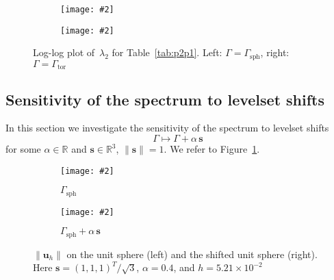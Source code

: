 \documentclass[12pt]{article}
\newcommand{\includegraphicsw}[2][1.]{\texttt{[image: \#2]}}
\newcommand{\vect}[1]{\boldsymbol{\mathbf{#1}}}
\newcommand{\sphere}{{\Gamma_{\text{sph}}}}
\newcommand{\tor}{{\Gamma_{\text{tor}}}}
\begin{document}
\addtocounter{table}{-1}
\begin{figure}[H]
	\centering\small
	\begin{subfigure}{.49\linewidth}
		\centering
		\includegraphicsw{sphere_2_P2P1_consistent.png}
	\end{subfigure}%
	\hfill
	\begin{subfigure}{.49\linewidth}
		\centering
		\includegraphicsw{torus_P2P1_consistent.png}
	\end{subfigure}
	\caption{Log-log plot of~$\lambda_2$ for Table~\ref{tab:p2p1}. Left: $\Gamma = \sphere$, right: $\Gamma = \tor$}
\end{figure}

\subsection{Sensitivity of the spectrum to levelset shifts}

In this section we investigate the sensitivity of the spectrum to levelset shifts
\begin{equation}\label{shift}
\Gamma \mapsto \Gamma + \alpha\,\vect s
\end{equation}
for some $\alpha \in \mathbb R$ and $\vect s \in \mathbb R^3$, $\|\vect s\| = 1$. We refer to Figure~\ref{fig:shift}.

\begin{figure}[H]
	\centering
	\begin{subfigure}{.2\linewidth}\end{subfigure}%
	\begin{subfigure}{.3\linewidth}
		\centering
		\includegraphicsw[.9]{{shift_0.0.cropped}.png}
		\caption{$\sphere$}
	\end{subfigure}%
	\begin{subfigure}{.3\linewidth}
		\centering
		\includegraphicsw[.9]{{shift_0.4.cropped}.png}
		\caption{$\sphere + \alpha\,\vect s$}
	\end{subfigure}%
	\begin{subfigure}{.2\linewidth}\end{subfigure}%
	\caption{$\|\vect u_h\|$ on the unit sphere (left) and the shifted unit sphere (right). Here $\vect s = (1, 1, 1)^T/\sqrt{3}$, $\alpha = 0.4$, and $h = 5.21\times10^{-2}$}
	\label{fig:shift}		
\end{figure}
\end{document}
